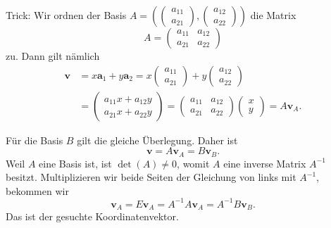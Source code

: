 \documentclass{beamer}
\newcommand{\bv}[1]{\mathbf{#1}}
\begin{document}
\begin{frame}[t]
\vspace{2em}
Trick: Wir ordnen der Basis
$A=(\begin{pmatrix}a_{11}\\ a_{21}\end{pmatrix},
\begin{pmatrix}a_{12}\\ a_{22}\end{pmatrix})$
die Matrix
\[A=\begin{pmatrix}a_{11} & a_{12}\\ a_{21} & a_{22}\end{pmatrix}\]
zu.\pause{} Dann gilt nämlich
\begin{align*}
\bv v &= x\bv a_1 + y\bv a_2 = x\begin{pmatrix}a_{11}\\ a_{21}\end{pmatrix}
+ y\begin{pmatrix}a_{12}\\ a_{22}\end{pmatrix}\\
&= \begin{pmatrix}a_{11}x + a_{12}y\\ a_{21}x + a_{22}y\end{pmatrix}
= \begin{pmatrix}a_{11} & a_{12}\\ a_{21} & a_{22}\end{pmatrix}\begin{pmatrix}x\\ y\end{pmatrix}
= A\bv v_A.
\end{align*}
\end{frame}

\begin{frame}
Für die Basis $B$ gilt die gleiche Überlegung. Daher ist
\[\bv v = A\bv v_A = B\bv v_B.\]\pause
Weil $A$ eine Basis ist, ist $\det(A)\ne 0$, womit $A$ eine
inverse Matrix $A^{-1}$ besitzt. Multiplizieren wir beide Seiten
der Gleichung von links mit $A^{-1}$, bekommen wir
\[\bv v_A = E\bv v_A = A^{-1}A\bv v_A = A^{-1}B\bv v_B.\]
Das ist der gesuchte Koordinatenvektor.
\end{frame}
\end{document}
